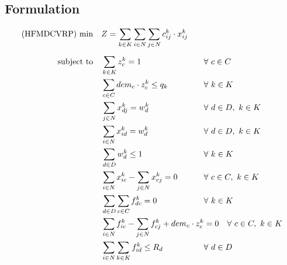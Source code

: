 \documentclass[preprint,review,12pt]{elsarticle}
\begin{document}
\subsection{Formulation}

\begin{align}
    \text{(HFMDCVRP) min} \quad        & Z = \sum\limits_{k\in K}\sum\limits_{i\in N}\sum\limits_{j\in N} c_{ij}^k \cdot x_{ij}^k    && \label{MDMVRP_FObj}    \\[5pt]
	\noindent \text{subject to} \quad & \sum\limits_{k \in K} z_{c}^k = 1  && \text{\hspace{-1cm}} \forall \ c \in C \label{MDMVRP_Service} \\
	& \sum\limits_{c \in C}dem_c \cdot z_{c}^k \leq q_k               && \text{\hspace{-1cm}} \forall \ k \in K  \label{MDMVRP_Capacity} \\
	& \sum\limits_{j \in N}x_{dj}^k = w_d^k                                         && \text{\hspace{-1cm}} \forall \ d \in D,\ k \in K \label{MDMVRP_StartRoute} \\
	& \sum\limits_{i \in N}x_{id}^k = w_d^k                                         && \text{\hspace{-1cm}} \forall \ d \in D,\ k \in K \label{MDMVRP_EndRoute} \\
	& \sum\limits_{d \in D} w_d^k \leq 1 && \text{\hspace{-1cm}} \forall \ k \in K \label{MDMVRP_OneDepo} \\
	& \sum\limits_{i \in N}x_{ic}^k - \sum\limits_{j \in N}x_{cj}^k = 0             && \text{\hspace{-1cm}} \forall \ c \in C,\ k \in K \label{MDMVRP_Balance} \\
	& \sum\limits_{d \in D}\sum\limits_{c \in C}f_{dc}^k = 0 && \text{\hspace{-1cm}} \forall \ k \in K \label{MDVMRP_InitialF} \\
	& \sum\limits_{i \in N}f_{ic}^k - \sum\limits_{j \in N}f_{cj}^k + dem_c \cdot z_{c}^k = 0             && \text{\hspace{0cm}} \forall \ c \in C,\ k \in K \label{MDMVRP_Flow} \\
	& \sum\limits_{i \in N}\sum\limits_{k \in K}f_{id}^k \leq R_d  && \text{\hspace{-1cm}} \forall \ d \in D \label{MDMVRP_DepotQ} \\

\end{align}
\end{document}
